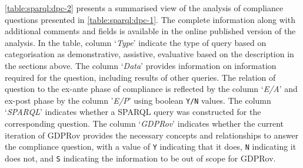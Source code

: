 \autoref{table:sparql:dpc-2} presents a summarised view of the analysis of compliance questions presented in \autoref{table:sparql:dpc-1}.
The complete information along with additional comments and fields is available in the online published version of the analysis.
In the table, column `\textit{Type}' indicate the type of query based on categorisation as demonstrative, assistive, evaluative based on the description in the sections above.
The column `\textit{Data}' provides information on information required for the question, including results of other queries.
The relation of question to the ex-ante phase of compliance is reflected by the column `\textit{E/A}' and ex-post phase by the column '\textit{E/P}' using boolean \texttt{Y/N} values.
The column `\textit{SPARQL}' indicates whether a SPARQL query was constructed for the corresponding question.
The column `\textit{GDPRov}' indicates whether the current iteration of GDPRov provides the necessary concepts and relationships to answer the compliance question, with a value of \texttt{Y} indicating that it does, \texttt{N} indicating it does not, and \texttt{S} indicating the information to be out of scope for GDPRov.
